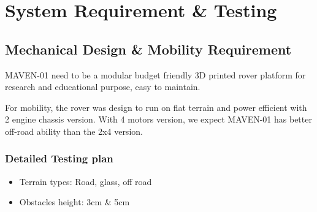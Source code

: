\begin{abstract}
 This abstract summarizes the design, development, and functional improvements of MAVEN-01, a rover platform whose primary objective is to provide a highly customizable mobile system for research and educational purpose. The report elaborates on the rover’s design and the techniques used in its development, such as 3D printing.
Furthermore, in addition to the mechanical frame design, this paper also focuses on the electrical system implemented in the rover. Due to limited budget and time constraints, we selected the popular ESP32 microcontroller, which features built-in Wi-Fi and Bluetooth capabilities for teleoperation purposes. Other components were also carefully chosen to balance performance and cost. For example, the DHT11 or DHT12 sensors are suitable for temperature and humidity measurement, while the HC-SR04 sensor is used for distance measurement.
The paper also discusses practical challenges, including durability, reliability, and ease of maintenance.


\end{abstract}

\section{System Requirement \& Testing}

\subsection{Mechanical Design \& Mobility Requirement}
MAVEN-01 need to be a modular budget friendly 3D printed rover platform for research and educational 
purpose, easy to maintain.

For mobility, the rover was design to run on flat terrain and power efficient with 2 engine chassis version.
With 4 motors version, we expect MAVEN-01 has better off-road ability than the 2x4 version.

\subsubsection{Detailed Testing plan}

\begin{itemize}
    \item Terrain types: Road, glass, off road
    \item Obstacles height: 3cm \& 5cm 
\end{itemize}

